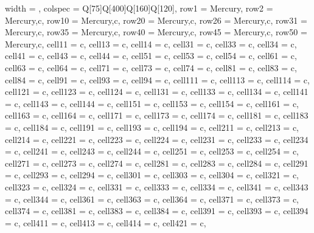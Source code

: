 \begin{longtblr}
[
caption={Tabela de requisitos funcionais},
label={tab:1},
]
{
  width = \linewidth,
  colspec = {Q[75]Q[400]Q[160]Q[120]},
  row{1} = {Mercury},
  row{2} = {Mercury,c},
  row{10} = {Mercury,c},
  row{20} = {Mercury,c},
  row{26} = {Mercury,c},
  row{31} = {Mercury,c},
  row{35} = {Mercury,c},
  row{40} = {Mercury,c},
  row{45} = {Mercury,c},
  row{50} = {Mercury,c},
  cell{1}{1} = {c},
  cell{1}{3} = {c},
  cell{1}{4} = {c},
  cell{3}{1} = {c},
  cell{3}{3} = {c},
  cell{3}{4} = {c},
  cell{4}{1} = {c},
  cell{4}{3} = {c},
  cell{4}{4} = {c},
  cell{5}{1} = {c},
  cell{5}{3} = {c},
  cell{5}{4} = {c},
  cell{6}{1} = {c},
  cell{6}{3} = {c},
  cell{6}{4} = {c},
  cell{7}{1} = {c},
  cell{7}{3} = {c},
  cell{7}{4} = {c},
  cell{8}{1} = {c},
  cell{8}{3} = {c},
  cell{8}{4} = {c},
  cell{9}{1} = {c},
  cell{9}{3} = {c},
  cell{9}{4} = {c},
  cell{11}{1} = {c},
  cell{11}{3} = {c},
  cell{11}{4} = {c},
  cell{12}{1} = {c},
  cell{12}{3} = {c},
  cell{12}{4} = {c},
  cell{13}{1} = {c},
  cell{13}{3} = {c},
  cell{13}{4} = {c},
  cell{14}{1} = {c},
  cell{14}{3} = {c},
  cell{14}{4} = {c},
  cell{15}{1} = {c},
  cell{15}{3} = {c},
  cell{15}{4} = {c},
  cell{16}{1} = {c},
  cell{16}{3} = {c},
  cell{16}{4} = {c},
  cell{17}{1} = {c},
  cell{17}{3} = {c},
  cell{17}{4} = {c},
  cell{18}{1} = {c},
  cell{18}{3} = {c},
  cell{18}{4} = {c},
  cell{19}{1} = {c},
  cell{19}{3} = {c},
  cell{19}{4} = {c},
  cell{21}{1} = {c},
  cell{21}{3} = {c},
  cell{21}{4} = {c},
  cell{22}{1} = {c},
  cell{22}{3} = {c},
  cell{22}{4} = {c},
  cell{23}{1} = {c},
  cell{23}{3} = {c},
  cell{23}{4} = {c},
  cell{24}{1} = {c},
  cell{24}{3} = {c},
  cell{24}{4} = {c},
  cell{25}{1} = {c},
  cell{25}{3} = {c},
  cell{25}{4} = {c},
  cell{27}{1} = {c},
  cell{27}{3} = {c},
  cell{27}{4} = {c},
  cell{28}{1} = {c},
  cell{28}{3} = {c},
  cell{28}{4} = {c},
  cell{29}{1} = {c},
  cell{29}{3} = {c},
  cell{29}{4} = {c},
  cell{30}{1} = {c},
  cell{30}{3} = {c},
  cell{30}{4} = {c},
  cell{32}{1} = {c},
  cell{32}{3} = {c},
  cell{32}{4} = {c},
  cell{33}{1} = {c},
  cell{33}{3} = {c},
  cell{33}{4} = {c},
  cell{34}{1} = {c},
  cell{34}{3} = {c},
  cell{34}{4} = {c},
  cell{36}{1} = {c},
  cell{36}{3} = {c},
  cell{36}{4} = {c},
  cell{37}{1} = {c},
  cell{37}{3} = {c},
  cell{37}{4} = {c},
  cell{38}{1} = {c},
  cell{38}{3} = {c},
  cell{38}{4} = {c},
  cell{39}{1} = {c},
  cell{39}{3} = {c},
  cell{39}{4} = {c},
  cell{41}{1} = {c},
  cell{41}{3} = {c},
  cell{41}{4} = {c},
  cell{42}{1} = {c},
}
\end{longtblr}
